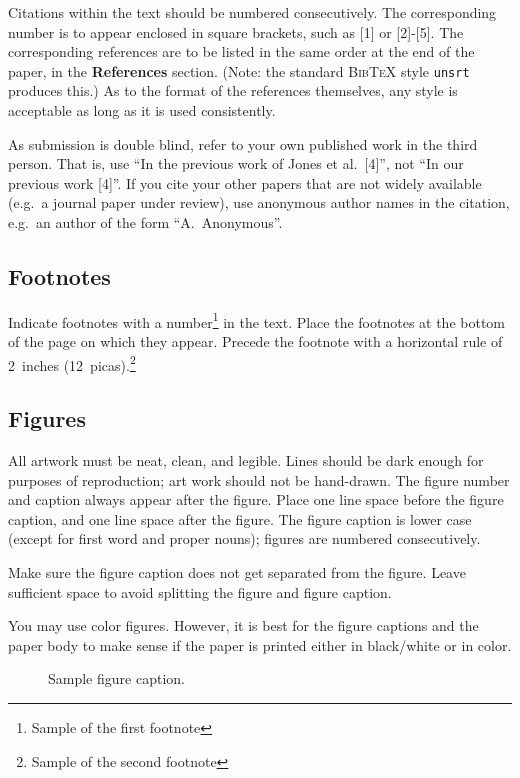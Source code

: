 \documentclass{article} %
\begin{document}
Citations within the text should be numbered consecutively. The corresponding
number is to appear enclosed in square brackets, such as [1] or [2]-[5]. The
corresponding references are to be listed in the same order at the end of the
paper, in the \textbf{References} section. (Note: the standard
\textsc{Bib\TeX} style \texttt{unsrt} produces this.) As to the format of the
references themselves, any style is acceptable as long as it is used
consistently.

As submission is double blind, refer to your own published work in the 
third person. That is, use ``In the previous work of Jones et al.\ [4]'',
not ``In our previous work [4]''. If you cite your other papers that
are not widely available (e.g.\ a journal paper under review), use
anonymous author names in the citation, e.g.\ an author of the
form ``A.\ Anonymous''. 


\subsection{Footnotes}

Indicate footnotes with a number\footnote{Sample of the first footnote} in the
text. Place the footnotes at the bottom of the page on which they appear.
Precede the footnote with a horizontal rule of 2~inches
(12~picas).\footnote{Sample of the second footnote}

\subsection{Figures}

All artwork must be neat, clean, and legible. Lines should be dark
enough for purposes of reproduction; art work should not be
hand-drawn. The figure number and caption always appear after the
figure. Place one line space before the figure caption, and one line
space after the figure. The figure caption is lower case (except for
first word and proper nouns); figures are numbered consecutively.

Make sure the figure caption does not get separated from the figure.
Leave sufficient space to avoid splitting the figure and figure caption.

You may use color figures. 
However, it is best for the
figure captions and the paper body to make sense if the paper is printed
either in black/white or in color.
\begin{figure}[h]
\begin{center}
\fbox{\rule[-.5cm]{0cm}{4cm} \rule[-.5cm]{4cm}{0cm}}
\end{center}
\caption{Sample figure caption.}
\end{figure}
\end{document}
